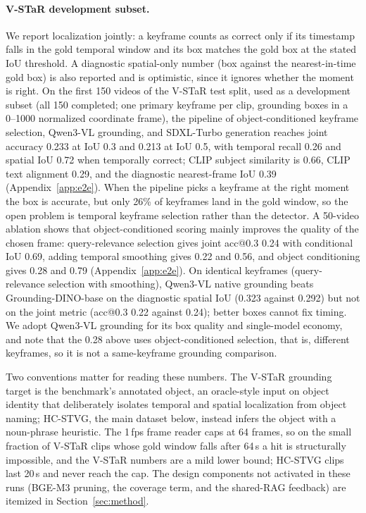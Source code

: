 \paragraph{V-STaR development subset.}
We report localization jointly: a keyframe counts as correct only if its timestamp falls in the gold temporal window and its box matches the gold box at the stated IoU threshold. A diagnostic spatial-only number (box against the nearest-in-time gold box) is also reported and is optimistic, since it ignores whether the moment is right. On the first 150 videos of the V-STaR test split, used as a development subset (all 150 completed; one primary keyframe per clip, grounding boxes in a 0--1000 normalized coordinate frame), the pipeline of object-conditioned keyframe selection, Qwen3-VL grounding, and SDXL-Turbo generation reaches joint accuracy 0.233 at IoU 0.3 and 0.213 at IoU 0.5, with temporal recall 0.26 and spatial IoU 0.72 when temporally correct; CLIP subject similarity is 0.66, CLIP text alignment 0.29, and the diagnostic nearest-frame IoU 0.39 (Appendix~\ref{app:e2e}). When the pipeline picks a keyframe at the right moment the box is accurate, but only 26\% of keyframes land in the gold window, so the open problem is temporal keyframe selection rather than the detector. A 50-video ablation shows that object-conditioned scoring mainly improves the quality of the chosen frame: query-relevance selection gives joint acc@0.3 0.24 with conditional IoU 0.69, adding temporal smoothing gives 0.22 and 0.56, and object conditioning gives 0.28 and 0.79 (Appendix~\ref{app:e2e}). On identical keyframes (query-relevance selection with smoothing), Qwen3-VL native grounding beats Grounding-DINO-base on the diagnostic spatial IoU (0.323 against 0.292) but not on the joint metric (acc@0.3 0.22 against 0.24); better boxes cannot fix timing. We adopt Qwen3-VL grounding for its box quality and single-model economy, and note that the 0.28 above uses object-conditioned selection, that is, different keyframes, so it is not a same-keyframe grounding comparison.

Two conventions matter for reading these numbers. The V-STaR grounding target is the benchmark's annotated object, an oracle-style input on object identity that deliberately isolates temporal and spatial localization from object naming; HC-STVG, the main dataset below, instead infers the object with a noun-phrase heuristic. The 1\,fps frame reader caps at 64 frames, so on the small fraction of V-STaR clips whose gold window falls after 64\,s a hit is structurally impossible, and the V-STaR numbers are a mild lower bound; HC-STVG clips last 20\,s and never reach the cap. The design components not activated in these runs (BGE-M3 pruning, the coverage term, and the shared-RAG feedback) are itemized in Section~\ref{sec:method}.

